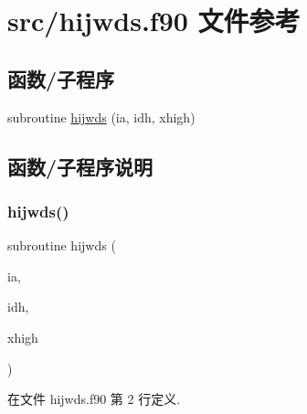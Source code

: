 \hypertarget{hijwds_8f90}{}\section{src/hijwds.f90 文件参考}
\label{hijwds_8f90}
\subsection*{函数/子程序}
\begin{DoxyCompactItemize}
\item 
subroutine \mbox{\hyperlink{hijwds_8f90_a6f361e36d3b8d2e5a02ed19276485643}{hijwds}} (ia, idh, xhigh)
\end{DoxyCompactItemize}


\subsection{函数/子程序说明}
\mbox{\label{hijwds_8f90_a6f361e36d3b8d2e5a02ed19276485643}} 
\subsubsection{\texorpdfstring{hijwds()}{hijwds()}}
{\footnotesize\ttfamily subroutine hijwds (\begin{DoxyParamCaption}\item[{}]{ia,  }\item[{}]{idh,  }\item[{}]{xhigh }\end{DoxyParamCaption})}



在文件 hijwds.\+f90 第 2 行定义.


